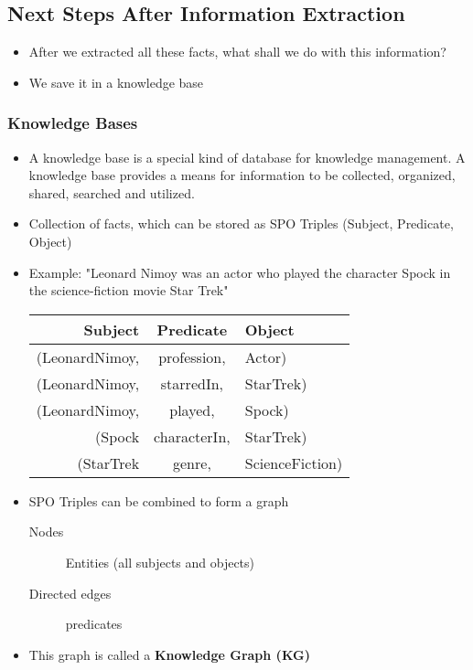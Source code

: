 		\subsection{Next Steps After Information Extraction} %
			\begin{itemize}
				\item After we extracted all these facts, what shall we do with this information?
				\item We save it in a knowledge base
			\end{itemize}
		
			\subsubsection{Knowledge Bases}
				\begin{itemize}
					\item A knowledge base is a special kind of database for knowledge management. A knowledge base provides a means for information to be collected, organized, shared, searched and utilized. 
					\item Collection of facts, which can be stored as SPO Triples (Subject, Predicate, Object)
					\item Example: "Leonard Nimoy was an actor who played the character Spock in the science-fiction movie Star Trek"
						\begin{table}[H]
							\centering
							\begin{tabular}{r | c | l}
								\textbf{Subject}  	& \textbf{Predicate} 	& \textbf{Object} 	\\ \hline
								(LeonardNimoy,		& profession,	 		& Actor)			\\
								(LeonardNimoy,    	& starredIn,	 		& StarTrek)			\\
								(LeonardNimoy,    	& played,		 		& Spock)		    \\
								(Spock 	        	& characterIn,	 		& StarTrek)	        \\
								(StarTrek          	& genre,		 		& ScienceFiction)	\\
							\end{tabular}
						\end{table}
					\item SPO Triples can be combined to form a graph
						\begin{description}
							\item[Nodes] Entities (all subjects and objects)
							\item[Directed edges] predicates 
						\end{description}
					\item This graph is called a \textbf{Knowledge Graph (KG)}
				\end{itemize}
